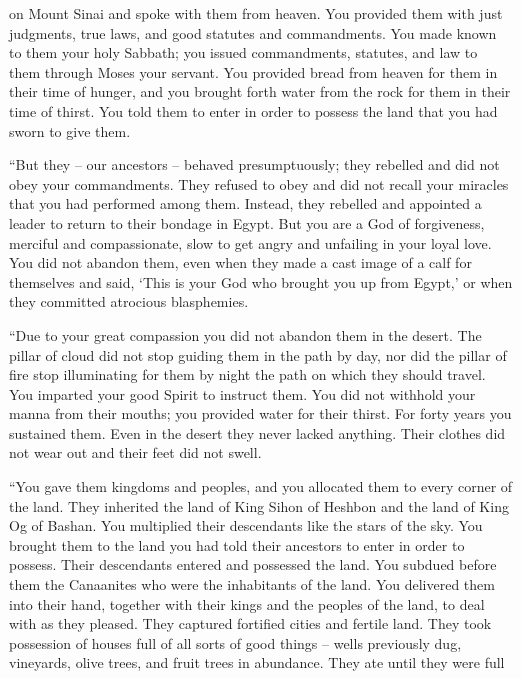 {on
Mount
Sinai
and spoke
with
them from heaven.
You provided them
with just judgments,
true
laws,
and good
statutes
and commandments.
You made known
to them your holy
Sabbath;
you issued
commandments,
statutes,
and law
to them
through
Moses
your servant.
You provided
bread
from heaven
for them in their time of hunger,
and you
brought forth
water
from the rock
for them in their time of thirst.
You told
them to enter
in order to possess
the
land
that you had
sworn
to give them.
\par }{\PP {}“But they
– our ancestors –
behaved presumptuously;
they rebelled and did not
obey
your commandments.
They refused
to obey
and did not
recall
your miracles
that
you had performed
among them.
Instead, they
rebelled
and appointed
a leader
to return
to their bondage
in Egypt. But you
are a God
of forgiveness,
merciful
and compassionate,
slow
to get angry
and unfailing
in your loyal love.
You did not
abandon them,
even
when
they made
a cast image
of a calf
for themselves and said,
‘This
is your God
who
brought you up
from Egypt,’
or when they committed
atrocious
blasphemies.
\par }{\PP {}“Due to your
great
compassion
you did not
abandon
them in the desert.
The
pillar
of cloud
did not
stop
guiding
them in the path
by day,
nor did the pillar
of fire
stop illuminating
for them by night
the
path
on which
they should travel.
You imparted
your good
Spirit
to instruct
them. You did not
withhold
your manna
from their mouths;
you provided
water
for their thirst.
For forty
years
you sustained them.
Even in the desert
they never
lacked
anything. Their clothes
did not
wear out
and their feet
did not
swell.
\par }{\PP {}“You gave
them kingdoms
and peoples,
and you allocated
them
to every corner
of the land.
They inherited
the land
of King
Sihon
of Heshbon
and the land
of King
Og
of Bashan.
You multiplied
their descendants
like the stars
of the sky.
You brought
them to
the land
you had
told
their ancestors
to enter
in order to possess.
Their descendants
entered
and possessed
the
land.
You subdued
before
them the Canaanites
who were the inhabitants
of the land.
You delivered
them into their hand,
together with their kings
and the
peoples
of the land,
to deal
with as they pleased.
They captured
fortified
cities
and fertile
land.
They took possession
of houses
full
of all sorts
of good things
– wells
previously dug,
vineyards,
olive trees,
and fruit
trees
in abundance.
They ate
until they were full
}
